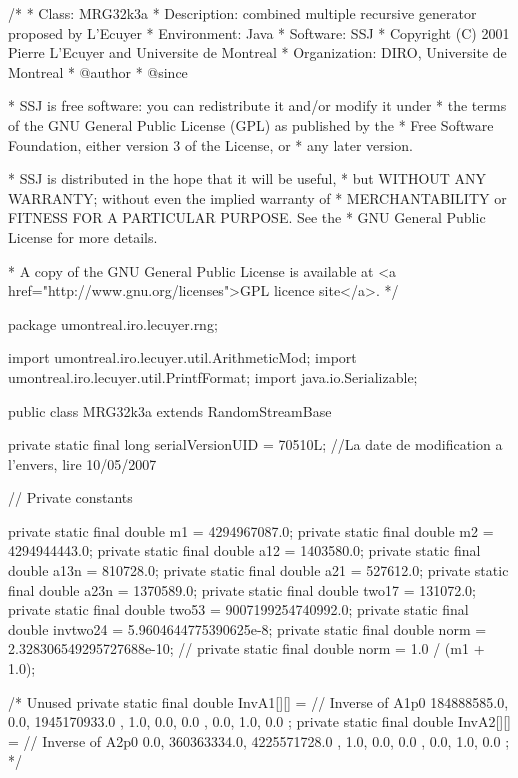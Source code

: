 \begin{code}
\begin{hide}
/*
 * Class:        MRG32k3a
 * Description:  combined multiple recursive generator proposed by L'Ecuyer
 * Environment:  Java
 * Software:     SSJ
 * Copyright (C) 2001  Pierre L'Ecuyer and Universite de Montreal
 * Organization: DIRO, Universite de Montreal
 * @author
 * @since

 * SSJ is free software: you can redistribute it and/or modify it under
 * the terms of the GNU General Public License (GPL) as published by the
 * Free Software Foundation, either version 3 of the License, or
 * any later version.

 * SSJ is distributed in the hope that it will be useful,
 * but WITHOUT ANY WARRANTY; without even the implied warranty of
 * MERCHANTABILITY or FITNESS FOR A PARTICULAR PURPOSE.  See the
 * GNU General Public License for more details.

 * A copy of the GNU General Public License is available at
   <a href="http://www.gnu.org/licenses">GPL licence site</a>.
 */
\end{hide}
package umontreal.iro.lecuyer.rng; \begin{hide}

import umontreal.iro.lecuyer.util.ArithmeticMod;
import umontreal.iro.lecuyer.util.PrintfFormat;
import java.io.Serializable;
\end{hide}

public class MRG32k3a extends RandomStreamBase \begin{hide} {

   private static final long serialVersionUID = 70510L;
   //La date de modification a l'envers, lire 10/05/2007

   // Private constants   %

   private static final double m1     = 4294967087.0;
   private static final double m2     = 4294944443.0;
   private static final double a12    =  1403580.0;
   private static final double a13n   =   810728.0;
   private static final double a21    =   527612.0;
   private static final double a23n   =  1370589.0;
   private static final double two17    =  131072.0;
   private static final double two53    =  9007199254740992.0;
   private static final double invtwo24 = 5.9604644775390625e-8;
   private static final double norm   = 2.328306549295727688e-10;
   //    private static final double norm   = 1.0 / (m1 + 1.0);


   /*  Unused
   private static final double InvA1[][] = {   // Inverse of A1p0
     { 184888585.0, 0.0, 1945170933.0 },
     {         1.0, 0.0,          0.0 },
     {         0.0, 1.0,          0.0 }
     };
   private static final double InvA2[][] = {   // Inverse of A2p0
     { 0.0, 360363334.0, 4225571728.0 },
     { 1.0,         0.0,          0.0 },
     { 0.0,         1.0,          0.0 }
     };
   */

}
\end{hide}
\end{code}
